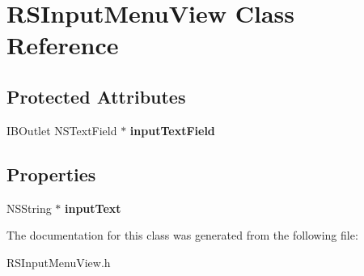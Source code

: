 \hypertarget{interface_r_s_input_menu_view}{
\section{RSInputMenuView Class Reference}
\label{interface_r_s_input_menu_view}
}
\subsection*{Protected Attributes}
\begin{DoxyCompactItemize}
\item 
\hypertarget{interface_r_s_input_menu_view_aeab755ef1907c3298f37946e23e06cf9}{
IBOutlet NSTextField $\ast$ {\bfseries inputTextField}}
\label{interface_r_s_input_menu_view_aeab755ef1907c3298f37946e23e06cf9}

\end{DoxyCompactItemize}
\subsection*{Properties}
\begin{DoxyCompactItemize}
\item 
\hypertarget{interface_r_s_input_menu_view_ada6d11b20593f406d970733ee15475ce}{
NSString $\ast$ {\bfseries inputText}}
\label{interface_r_s_input_menu_view_ada6d11b20593f406d970733ee15475ce}

\end{DoxyCompactItemize}


The documentation for this class was generated from the following file:\begin{DoxyCompactItemize}
\item 
RSInputMenuView.h\end{DoxyCompactItemize}
